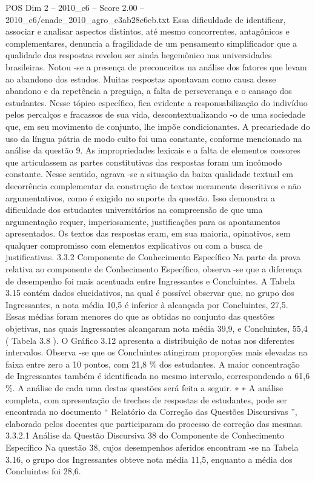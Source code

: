 \begin{textsample}{POS Dim 2 – 2010\_c6 – Score 2.00 – 2010\_c6/enade\_2010\_agro\_c3ab28c6eb.txt}
Essa dificuldade de identificar, associar e analisar aspectos distintos, até mesmo concorrentes, antagônicos e complementares, denuncia a fragilidade de um pensamento simplificador que a qualidade das respostas revelou ser ainda hegemônico nas universidades brasileiras.
Notou -se a presença de preconceitos na análise dos fatores que levam ao abandono dos estudos.
Muitas respostas apontavam como causa desse abandono e da repetência a preguiça, a falta de perseverança e o cansaço dos estudantes.
Nesse tópico específico, fica evidente a responsabilização do indivíduo pelos percalços e fracassos de sua vida, descontextualizando -o de uma sociedade que, em seu movimento de conjunto, lhe impõe condicionantes.
A precariedade do uso da língua pátria de modo culto foi uma constante, conforme mencionado na análise da questão 9.
As impropriedades lexicais e a falta de elementos coesores que articulassem as partes constitutivas das respostas foram um incômodo constante.
Nesse sentido, agrava -se a situação da baixa qualidade textual em decorrência complementar da construção de textos meramente descritivos e não argumentativos, como é exigido no suporte da questão.
Isso demonstra a dificuldade dos estudantes universitários na compreensão de que uma argumentação requer, imperiosamente, justificações para os apontamentos apresentados.
Os textos das respostas eram, em sua maioria, opinativos, sem qualquer compromisso com elementos explicativos ou com a busca de justificativas. 3.3.2 Componente de Conhecimento Específico Na parte da prova relativa ao componente de Conhecimento Específico, observa -se que a diferença de desempenho foi mais acentuada entre Ingressantes e Concluintes.
A Tabela 3.15 contém dados elucidativos, na qual é possível observar que, no grupo dos Ingressantes, a nota média 10,5 é inferior à alcançada por Concluintes, 27,5.
Essas médias foram menores do que as obtidas no conjunto das questões objetivas, nas quais Ingressantes alcançaram nota média 39,9, e Concluintes, 55,4 ( Tabela 3.8 ).
O Gráfico 3.12 apresenta a distribuição de notas nos diferentes intervalos.
Observa -se que os Concluintes atingiram proporções mais elevadas na faixa entre zero a 10 pontos, com 21,8 \% dos estudantes.
A maior concentração de Ingressantes também é identificada no mesmo intervalo, correspondendo a 61,6 \%.
A análise de cada uma destas questões será feita a seguir. ∗ ∗ A análise completa, com apresentação de trechos de respostas de estudantes, pode ser encontrada no documento “ Relatório da Correção das Questões Discursivas ”, elaborado pelos docentes que participaram do processo de correção das mesmas. 3.3.2.1 Análise da Questão Discursiva 38 do Componente de Conhecimento Específico Na questão 38, cujos desempenhos aferidos encontram -se na Tabela 3.16, o grupo dos Ingressantes obteve nota média 11,5, enquanto a média dos Concluintes foi 28,6.

\end{textsample}

